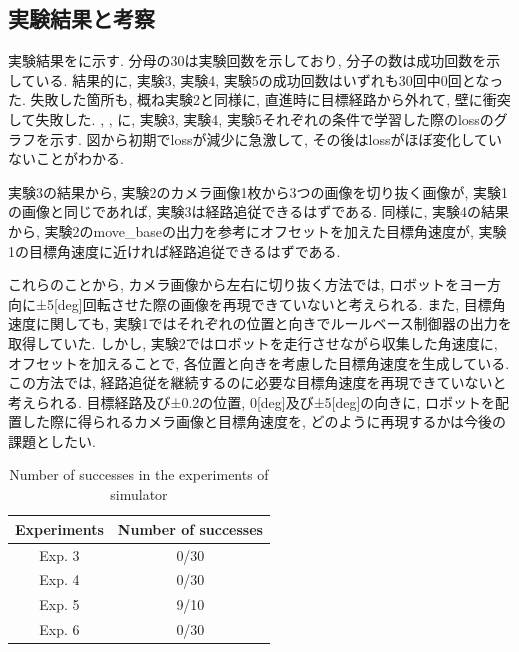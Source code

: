 \newpage
\subsection{実験結果と考察}
実験結果をに示す. 分母の30は実験回数を示しており, 分子の数は成功回数を示している. 結果的に, 実験3, 実験4, 実験5の成功回数はいずれも30回中0回となった. 失敗した箇所も, 概ね実験2と同様に, 直進時に目標経路から外れて, 壁に衝突して失敗した. , , に, 実験3, 実験4, 実験5それぞれの条件で学習した際のlossのグラフを示す. 図から初期でlossが減少に急激して, その後はlossがほぼ変化していないことがわかる. 
\par 実験3の結果から, 実験2のカメラ画像1枚から3つの画像を切り抜く画像が, 実験1の画像と同じであれば, 実験3は経路追従できるはずである. 同様に, 実験4の結果から, 実験2のmove\_baseの出力を参考にオフセットを加えた目標角速度が, 実験1の目標角速度に近ければ経路追従できるはずである. 
\par これらのことから, カメラ画像から左右に切り抜く方法では, ロボットをヨー方向に±5[deg]回転させた際の画像を再現できていないと考えられる. また, 目標角速度に関しても, 実験1ではそれぞれの位置と向きでルールベース制御器の出力を取得していた. しかし, 実験2ではロボットを走行させながら収集した角速度に, オフセットを加えることで, 各位置と向きを考慮した目標角速度を生成している. この方法では, 経路追従を継続するのに必要な目標角速度を再現できていないと考えられる. 目標経路及び±0.2の位置, 0[deg]及び±5[deg]の向きに, ロボットを配置した際に得られるカメラ画像と目標角速度を, どのように再現するかは今後の課題としたい. 

\newpage
\begin{table}[h]
  \centering
  \caption{Number of successes in the experiments of simulator}
  \begin{tabular}{|c|c|} \hline
      Experiments & Number of successes \\ \hline
      Exp. 3 & 0/30 \\ \hline
      Exp. 4 & 0/30 \\ \hline
      Exp. 5 & 9/10 \\ \hline
      Exp. 6 & 0/30 \\ \hline
    \end{tabular}
  \label{tb:inves}
\end{table}

